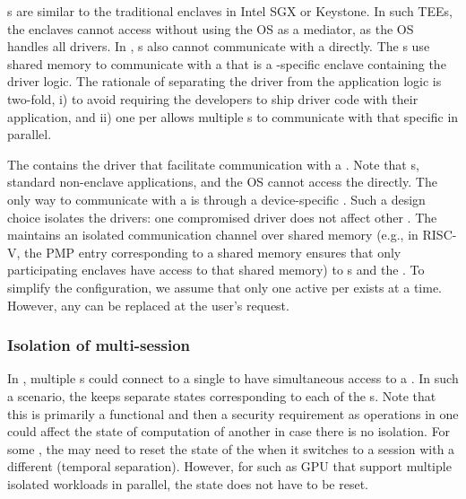  \App{}s are similar to the traditional enclaves in Intel SGX or Keystone. In such TEEs, the enclaves cannot access \sphw without using the OS as a mediator, as the OS handles all drivers. In \name, \app{}s also cannot communicate with a \sphw directly. The \app{}s use shared memory to communicate with a \ce that is a \sphw-specific enclave containing the driver logic. The rationale of separating the driver from the application logic is two-fold, i) to avoid requiring the developers to ship driver code with their application, and ii) one \ce per \sphw allows multiple \app{}s to communicate with that specific \sphw in parallel. %


 The \ce contains the driver that facilitate communication with a \sphw. Note that \app{}s, standard non-enclave applications, and the OS cannot access the \sphw directly. The only way to communicate with a \sphw is through a device-specific \ce. Such a design choice isolates the \sphw drivers: one compromised driver does not affect other \sphw. The \ce maintains an isolated communication channel over shared memory (e.g., in RISC-V, the PMP entry corresponding to a shared memory ensures that only participating enclaves have access to that shared memory) to \app{}s and the \sphw. To simplify the configuration, we assume that only one active \ce per \sphw exists at a time. However, any \ce can be replaced at the user's request. %

\subsubsection{Isolation of multi-\app session}\label{sec:programmingModel:systemComponents:multiApp} In \name, multiple \app{}s could connect to a single \ce to have simultaneous access to a \sphw. In such a scenario, the \ce keeps separate states corresponding to each of the \app{}s. Note that this is primarily a functional and then a security requirement as operations in one \app could affect the state of computation of another \app in case there is no isolation. For some \sphw, the \ce may need to reset the state of the \sphw when it switches to a session with a different \app (temporal separation). However, for \sphw such as GPU that support multiple isolated workloads in parallel, the state does not have to be reset.



